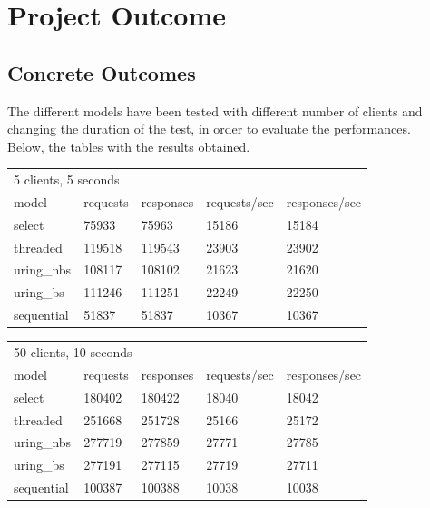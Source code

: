 \section{Project Outcome}

\subsection{Concrete Outcomes}

The different models have been tested with different number of clients and changing the duration of the test, in order to evaluate the performances. \\
Below, the tables with the results obtained.


\begin{table}[H]
\centering
\begin{tabular}{lllll}
\multicolumn{5}{l}{5 clients, 5 seconds}                         \\
model      & requests & responses & requests/sec & responses/sec \\
select     & 75933    & 75963     & 15186        & 15184         \\
threaded   & 119518   & 119543    & 23903        & 23902         \\
uring\_nbs & 108117   & 108102    & 21623        & 21620         \\
uring\_bs  & 111246   & 111251    & 22249        & 22250         \\
sequential & 51837    & 51837     & 10367        & 10367        
\end{tabular}
\end{table}

\begin{table}[H]
\centering
\begin{tabular}{lllll}
\multicolumn{5}{l}{50 clients, 10 seconds}                       \\
model      & requests & responses & requests/sec & responses/sec \\
select     & 180402   & 180422    & 18040        & 18042         \\
threaded   & 251668   & 251728    & 25166        & 25172         \\
uring\_nbs & 277719   & 277859    & 27771        & 27785         \\
uring\_bs  & 277191   & 277115    & 27719        & 27711         \\
sequential & 100387   & 100388    & 10038        & 10038        
\end{tabular}
\end{table}


